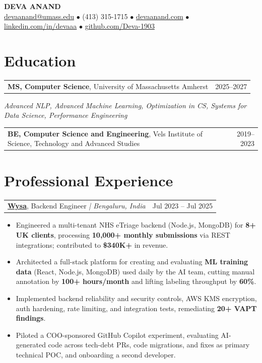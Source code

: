 \documentclass[letterpaper,11pt]{article}
\makeatletter
\newcommand{\eduItem}[3]{%
  \begin{tabular*}{\textwidth}{@{}l@{\extracolsep{\fill}}r@{}}
    \textbf{#1}, #2 & #3 \\
  \end{tabular*}\par
}
\newcommand{\expItem}[4]{%
  \vspace{3pt}
  \begin{tabular*}{\textwidth}{@{}l@{\extracolsep{\fill}}r@{}}
    \textbf{#1}, #2 \textit{| #3} & #4 \\
  \end{tabular*}\par\vspace{-2pt}
}
\makeatother
\begin{document}
\begin{center}
    {\fontsize{18}{20}\selectfont\bfseries DEVA ANAND}\\ \vspace{3pt}
    {\small
    \href{mailto:devaanand@umass.edu}{devaanand@umass.edu}
    \enspace$\bullet$\enspace
    (413) 315-1715
    \enspace$\bullet$\enspace
    \href{https://devaanand.com}{devaanand.com}
    \enspace$\bullet$\enspace
    \href{https://linkedin.com/in/devaaa/}{linkedin.com/in/devaaa}
    \enspace$\bullet$\enspace
    \href{https://github.com/Deva-1903}{github.com/Deva-1903}}
\end{center}
\vspace{-6pt}

\section{Education}
\eduItem{MS, Computer Science}{University of Massachusetts Amherst}{2025--2027}
{\small\textit{Advanced NLP, Advanced Machine Learning, Optimization in CS, Systems for Data Science, Performance Engineering}}\par
\vspace{3pt}
\eduItem{BE, Computer Science and Engineering}{Vels Institute of Science, Technology and Advanced Studies}{2019--2023}

\section{Professional Experience}

\expItem{\href{https://www.wysa.io}{Wysa}}{Backend Engineer}{Bengaluru, India}{Jul 2023 -- Jul 2025}
\begin{itemize}
  \item Engineered a multi-tenant NHS eTriage backend (Node.js, MongoDB) for \textbf{8+ UK clients}, processing \textbf{10{,}000+ monthly submissions} via REST integrations; contributed to \textbf{\$340K+} in revenue.
  \item Architected a full-stack platform for creating and evaluating \textbf{ML training data} (React, Node.js, MongoDB) used daily by the AI team, cutting manual annotation by \textbf{100+ hours/month} and lifting labeling throughput by \textbf{60\%}.
  \item Implemented backend reliability and security controls, AWS KMS encryption, auth hardening, rate limiting, and integration tests, remediating \textbf{20+ VAPT findings}.
  \item Piloted a COO-sponsored GitHub Copilot experiment, evaluating AI-generated code across tech-debt PRs, code migrations, and fixes as primary technical POC, and onboarding a second developer.
\end{itemize}
\end{document}
